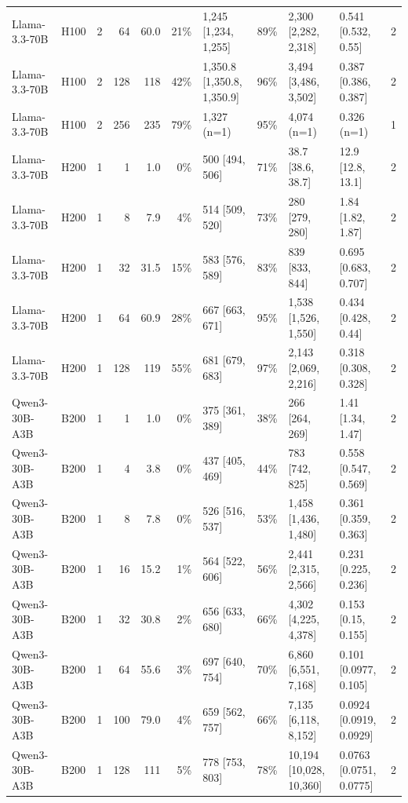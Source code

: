 \begin{landscape}
\begin{longtable}{llrrrrlrllr}
Llama-3.3-70B & H100 & 2 & 64 & 60.0 & 21\% & 1,245 {[}1,234, 1,255{]} & 89\% & 2,300 {[}2,282, 2,318{]} & 0.541 {[}0.532, 0.55{]} & 2 \\
Llama-3.3-70B & H100 & 2 & 128 & 118 & 42\% & 1,350.8 {[}1,350.8, 1,350.9{]} & 96\% & 3,494 {[}3,486, 3,502{]} & 0.387 {[}0.386, 0.387{]} & 2 \\
Llama-3.3-70B & H100 & 2 & 256 & 235 & 79\% & 1,327 (n=1) & 95\% & 4,074 (n=1) & 0.326 (n=1) & 1 \\
Llama-3.3-70B & H200 & 1 & 1 & 1.0 & 0\% & 500 {[}494, 506{]} & 71\% & 38.7 {[}38.6, 38.7{]} & 12.9 {[}12.8, 13.1{]} & 2 \\
Llama-3.3-70B & H200 & 1 & 8 & 7.9 & 4\% & 514 {[}509, 520{]} & 73\% & 280 {[}279, 280{]} & 1.84 {[}1.82, 1.87{]} & 2 \\
Llama-3.3-70B & H200 & 1 & 32 & 31.5 & 15\% & 583 {[}576, 589{]} & 83\% & 839 {[}833, 844{]} & 0.695 {[}0.683, 0.707{]} & 2 \\
Llama-3.3-70B & H200 & 1 & 64 & 60.9 & 28\% & 667 {[}663, 671{]} & 95\% & 1,538 {[}1,526, 1,550{]} & 0.434 {[}0.428, 0.44{]} & 2 \\
Llama-3.3-70B & H200 & 1 & 128 & 119 & 55\% & 681 {[}679, 683{]} & 97\% & 2,143 {[}2,069, 2,216{]} & 0.318 {[}0.308, 0.328{]} & 2 \\
Qwen3-30B-A3B & B200 & 1 & 1 & 1.0 & 0\% & 375 {[}361, 389{]} & 38\% & 266 {[}264, 269{]} & 1.41 {[}1.34, 1.47{]} & 2 \\
Qwen3-30B-A3B & B200 & 1 & 4 & 3.8 & 0\% & 437 {[}405, 469{]} & 44\% & 783 {[}742, 825{]} & 0.558 {[}0.547, 0.569{]} & 2 \\
Qwen3-30B-A3B & B200 & 1 & 8 & 7.8 & 0\% & 526 {[}516, 537{]} & 53\% & 1,458 {[}1,436, 1,480{]} & 0.361 {[}0.359, 0.363{]} & 2 \\
Qwen3-30B-A3B & B200 & 1 & 16 & 15.2 & 1\% & 564 {[}522, 606{]} & 56\% & 2,441 {[}2,315, 2,566{]} & 0.231 {[}0.225, 0.236{]} & 2 \\
Qwen3-30B-A3B & B200 & 1 & 32 & 30.8 & 2\% & 656 {[}633, 680{]} & 66\% & 4,302 {[}4,225, 4,378{]} & 0.153 {[}0.15, 0.155{]} & 2 \\
Qwen3-30B-A3B & B200 & 1 & 64 & 55.6 & 3\% & 697 {[}640, 754{]} & 70\% & 6,860 {[}6,551, 7,168{]} & 0.101 {[}0.0977, 0.105{]} & 2 \\
Qwen3-30B-A3B & B200 & 1 & 100 & 79.0 & 4\% & 659 {[}562, 757{]} & 66\% & 7,135 {[}6,118, 8,152{]} & 0.0924 {[}0.0919, 0.0929{]} & 2 \\
Qwen3-30B-A3B & B200 & 1 & 128 & 111 & 5\% & 778 {[}753, 803{]} & 78\% & 10,194 {[}10,028, 10,360{]} & 0.0763 {[}0.0751, 0.0775{]} & 2 \\

\end{longtable}
\end{landscape}
